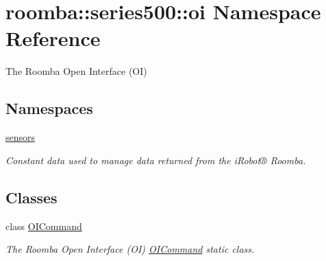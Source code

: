 \hypertarget{namespaceroomba_1_1series500_1_1oi}{\section{roomba\+:\+:series500\+:\+:oi Namespace Reference}
\label{namespaceroomba_1_1series500_1_1oi}
}


The Roomba Open Interface (O\+I)  


\subsection*{Namespaces}
\begin{DoxyCompactItemize}
\item 
 \hyperlink{namespaceroomba_1_1series500_1_1oi_1_1sensors}{sensors}
\begin{DoxyCompactList}\small\item\em Constant data used to manage data returned from the i\+Robot® Roomba. \end{DoxyCompactList}\end{DoxyCompactItemize}
\subsection*{Classes}
\begin{DoxyCompactItemize}
\item 
class \hyperlink{classroomba_1_1series500_1_1oi_1_1_o_i_command}{O\+I\+Command}
\begin{DoxyCompactList}\small\item\em The Roomba Open Interface (O\+I) \hyperlink{classroomba_1_1series500_1_1oi_1_1_o_i_command}{O\+I\+Command} static class. \end{DoxyCompactList}\end{DoxyCompactItemize}
